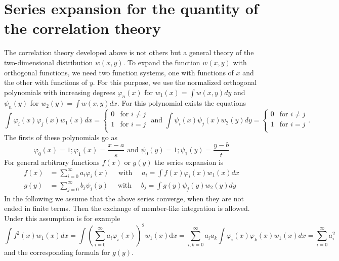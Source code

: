 \documentclass{article}
\begin{document}
\section{Series expansion for the quantity of the correlation theory}
The correlation theory developed above is not others but
a general theory of the two-dimensional distribution
$w(x,y)$.
To expand the function $w(x,y)$
with orthogonal functions, we need two function systems,
one with functions of $x$
and the other with functions of $y$.
For this purpose, we use the normalized
orthogonal polynomials with increasing degrees $\varphi_n(x)$
for $w_1(x)=\int w(x,y)dy$ and $\psi_n(y)$
for $w_2(y) = \int w(x,y)dx$. For this polynomial
exists the equations
\begin{equation}
    \int \varphi_i(x)
    \varphi_j(x) w_1(x)dx
    =\begin{cases}
    0 & \textrm{for } i\neq j\\
    1 &\textrm{for } i= j\\
    \end{cases}
    \textrm{ and } \int \psi_i(x)
    \psi_j(x) w_2(y)dy
    =\begin{cases}
    0 & \textrm{for } i\neq j\\
    1 &\textrm{for } i= j\\
    \end{cases}.
\end{equation}
The firsts of these polynomials go as
$$
\varphi_0(x) = 1;
\varphi_1(x) = \frac{x-a}{s} \textrm{ and }
\psi_0(y) = 1;
\psi_1(y) = \frac{y-b}{t}
$$
For general arbitrary functions $f(x)$
or $g(y)$ the series expansion is
\begin{equation}
\begin{aligned}
f(x) &=\sum_{i=0}^{\infty} a_{i} \varphi_{i}(x) \quad \text { with } \quad a_{i}=\int f(x) \varphi_{i}(x) w_{1}(x) d x \\
g(y) &=\sum_{j=0}^{\infty} b_{j} \psi_{i}(y) \quad \text { with } \quad b_{j}=\int g(y) \psi_{j}(y) w_{2}(y) d y
\end{aligned}
\end{equation}
In the following we assume that the above series converge, when
they are not ended in finite terms. Then the exchange of member-like integration is allowed.
Under this assumption is for example
$$
\int f^{2}(x) w_{1}(x) dx=\int\left(\sum_{i=0}^{\infty} a_{i} \varphi_{i}(x)\right)^{2}w_{1}(x) \mathrm{d} x=\sum_{i, k=0}^{\infty} a_{i} a_{k} \int \varphi_{i}(x) \varphi_{k}(x) w_{1}(x) d x=\sum_{i=0}^{\infty} a_{i}^{2}
$$
and the corresponding formula for $g(y)$.
\end{document}
